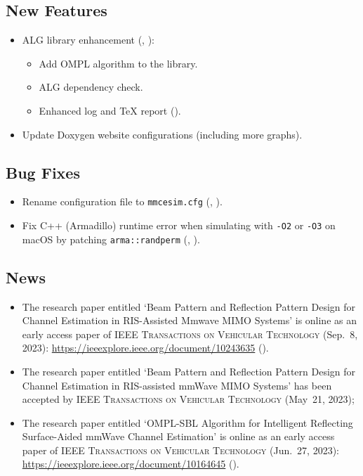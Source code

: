 \subsection*{New Features}
\begin{itemize}
  \item ALG library enhancement (, ):
  \begin{itemize}
    \item Add OMPL \cite{zhao2023ompl} algorithm to the library.
    \item ALG dependency check.
    \item Enhanced log and \TeX{} report ().
  \end{itemize}
  \item Update Doxygen website configurations (including more graphs).
\end{itemize}
\subsection*{Bug Fixes}
\begin{itemize}
  \item Rename configuration file to \texttt{mmcesim.cfg} (, ).
  \item Fix C++ (Armadillo) runtime error when simulating with \texttt{-O2} or \texttt{-O3} on macOS by patching \texttt{arma::randperm} (, ).
\end{itemize}
\subsection*{News}
\begin{itemize}
  \item The research paper entitled `Beam Pattern and Reflection Pattern Design for Channel Estimation in RIS-Assisted Mmwave MIMO Systems' \cite{you2023beam} is online as an early access paper of \textsc{IEEE Transactions on Vehicular Technology} (Sep.~8, 2023): \url{https://ieeexplore.ieee.org/document/10243635} ().
  \item The research paper entitled `Beam Pattern and Reflection Pattern Design for Channel Estimation in RIS-assisted mmWave MIMO Systems' \cite{you2023beam} has been accepted by \textsc{IEEE Transactions on Vehicular Technology} (May~21, 2023);
  \item The research paper entitled `OMPL-SBL Algorithm for Intelligent Reflecting Surface-Aided mmWave Channel Estimation' \cite{zhao2023ompl} is online as an early access paper of \textsc{IEEE Transactions on Vehicular Technology} (Jun.~27, 2023): \url{https://ieeexplore.ieee.org/document/10164645} ().
\end{itemize}

